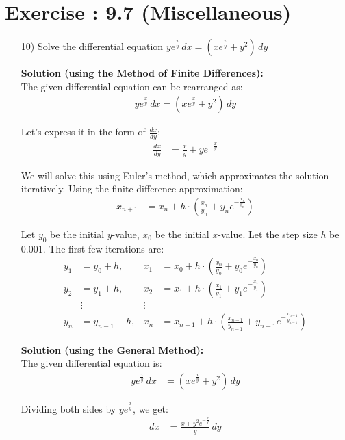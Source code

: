 \documentclass[journal]{IEEEtran}
\begin{document}
\section*{Exercise : 9.7 (Miscellaneous)}
\begin{enumerate}
\item [10)] Solve the differential equation  $y e^{\frac{x}{y}} \, dx = \left(x e^{\frac{x}{y}} + y^2\right) \, dy $

\textbf{Solution (using the Method of Finite Differences):}\\
The given differential equation can be rearranged as:
\begin{align}
     y e^{\frac{x}{y}} \, dx = \left(x e^{\frac{x}{y}} + y^2\right) \, dy
\end{align}

Let's express it in the form of \( \frac{dx}{dy} \):
\begin{align}
    \frac{dx}{dy} &= \frac{x}{y} + y e^{-\frac{x}{y}}
\end{align}

We will solve this using Euler's method, which approximates the solution iteratively. Using the finite difference approximation:
\begin{align}
    x_{n+1} &= x_n + h \cdot \left(\frac{x_n}{y_n} + y_n e^{-\frac{x_n}{y_n}}\right)
\end{align}

Let $y_0$ be the initial $y$-value, $x_0$ be the initial $x$-value. Let the step size $h$ be 0.001. The first few iterations are:
\begin{align*}
    y_1 &= y_0 + h, & x_1 &= x_0 + h \cdot \left(\frac{x_0}{y_0} + y_0 e^{-\frac{x_0}{y_0}}\right) \\
    y_2 &= y_1 + h, & x_2 &= x_1 + h \cdot \left(\frac{x_1}{y_1} + y_1 e^{-\frac{x_1}{y_1}}\right) \\
    &\vdots  & \vdots \\
    y_n &= y_{n-1} + h, & x_n &= x_{n-1} + h \cdot \left(\frac{x_{n-1}}{y_{n-1}} + y_{n-1} e^{-\frac{x_{n-1}}{y_{n-1}}}\right)
\end{align*}

\textbf{Solution (using the General Method):}\\
The given differential equation is:
\begin{align}
    y e^{\frac{x}{y}} \, dx &= \left(x e^{\frac{x}{y}} + y^2\right) \, dy
\end{align}

Dividing both sides by \( y e^{\frac{x}{y}} \), we get:
\begin{align}
    dx &= \frac{x + y^2 e^{-\frac{x}{y}}}{y} \, dy
\end{align}


\end{enumerate}
\end{document}
